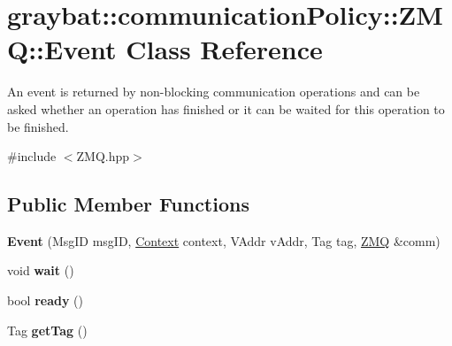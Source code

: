\hypertarget{classgraybat_1_1communicationPolicy_1_1ZMQ_1_1Event}{}\section{graybat\+:\+:communication\+Policy\+:\+:Z\+M\+Q\+:\+:Event Class Reference}
\label{classgraybat_1_1communicationPolicy_1_1ZMQ_1_1Event}


An event is returned by non-\/blocking communication operations and can be asked whether an operation has finished or it can be waited for this operation to be finished.  




{\ttfamily \#include $<$Z\+M\+Q.\+hpp$>$}

\subsection*{Public Member Functions}
\begin{DoxyCompactItemize}
\item 
\hypertarget{classgraybat_1_1communicationPolicy_1_1ZMQ_1_1Event_ad1efbc3374f29acef2c6eea5afc2f6cd}{}{\bfseries Event} (Msg\+I\+D msg\+I\+D, \hyperlink{classgraybat_1_1communicationPolicy_1_1ZMQ_1_1Context}{Context} context, V\+Addr v\+Addr, Tag tag, \hyperlink{structgraybat_1_1communicationPolicy_1_1ZMQ}{Z\+M\+Q} \&comm)\label{classgraybat_1_1communicationPolicy_1_1ZMQ_1_1Event_ad1efbc3374f29acef2c6eea5afc2f6cd}

\item 
\hypertarget{classgraybat_1_1communicationPolicy_1_1ZMQ_1_1Event_a2cca9f91a63872f5385ce32e6d4fe991}{}void {\bfseries wait} ()\label{classgraybat_1_1communicationPolicy_1_1ZMQ_1_1Event_a2cca9f91a63872f5385ce32e6d4fe991}

\item 
\hypertarget{classgraybat_1_1communicationPolicy_1_1ZMQ_1_1Event_a6c68a8a90b3e1e633b9be351c97b3a84}{}bool {\bfseries ready} ()\label{classgraybat_1_1communicationPolicy_1_1ZMQ_1_1Event_a6c68a8a90b3e1e633b9be351c97b3a84}

\item 
\hypertarget{classgraybat_1_1communicationPolicy_1_1ZMQ_1_1Event_ad516d0e16960045eb6558b78c557cee6}{}Tag {\bfseries get\+Tag} ()\label{classgraybat_1_1communicationPolicy_1_1ZMQ_1_1Event_ad516d0e16960045eb6558b78c557cee6}

\end{DoxyCompactItemize}
